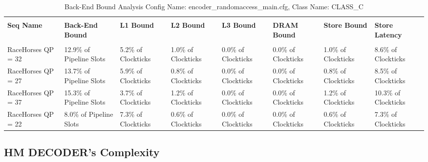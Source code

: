\documentclass{article}%
\begin{document}
\begin{longtabu}{| X[l] | X[l] | X[l] | X[l] | X[l] | X[l] | X[l] | X[l] |}%
\caption{%
Back{-}End Bound Analysis\newline%
 Config Name: encoder\_randomaccess\_main.cfg,\newline%
 Class Name: CLASS\_C\newline%
%
}%
\hline%
&&&&&&&\\%
\textbf{Seq Name}&\textbf{Back{-}End Bound}&\textbf{L1 Bound}&\textbf{L2 Bound}&\textbf{L3 Bound}&\textbf{DRAM Bound}&\textbf{Store Bound}&\textbf{Store Latency}\\%
&&&&&&&\\%
\hline%
\endhead%
RaceHorses\newline%
 QP = 32&12.9\% of Pipeline Slots&5.2\% of Clockticks&1.0\% of Clockticks&0.0\% of Clockticks&0.0\% of Clockticks&1.0\% of Clockticks&8.6\% of Clockticks\\%
\hline%
RaceHorses\newline%
 QP = 27&13.7\% of Pipeline Slots&5.9\% of Clockticks&0.8\% of Clockticks&0.0\% of Clockticks&0.0\% of Clockticks&0.8\% of Clockticks&8.5\% of Clockticks\\%
\hline%
RaceHorses\newline%
 QP = 37&15.3\% of Pipeline Slots&3.7\% of Clockticks&1.2\% of Clockticks&0.0\% of Clockticks&0.0\% of Clockticks&1.2\% of Clockticks&10.3\% of Clockticks\\%
\hline%
RaceHorses\newline%
 QP = 22&8.0\% of Pipeline Slots&7.3\% of Clockticks&0.6\% of Clockticks&0.0\% of Clockticks&0.0\% of Clockticks&0.6\% of Clockticks&7.3\% of Clockticks\\%
\hline%
\end{longtabu}%
\newpage

%
\subsection{HM DECODER's Complexity}%
\label{subsec:HMDECODERsComplexity}%
\end{document}
